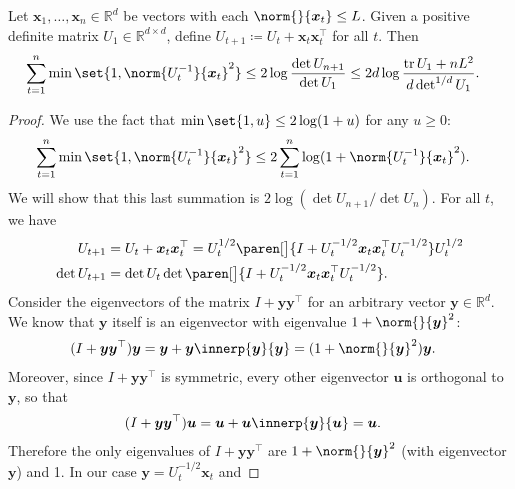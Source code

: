 \documentclass{article}
\renewcommand{\vec}[1]{\bm{#1}}
\newcommand{\defeq}{\coloneq}
\newcommand{\inv}[1]{#1^{-1}}
\newcommand{\Real}{\mathds{R}}
\newcommand{\tr}{\operatorname{tr}}
\renewcommand{\det}{\operatorname{det}}
\DeclarePairedDelimiter{\paren}()
\providecommand\transp{\top}
\let\transpsymbol\transp
\renewcommand{\transp}[1]{#1^\transpsymbol}
\begin{document}
\begin{lemma}\label{lemma:elliptical-potential}
  Let $\vec x_1,\dotsc,\vec x_n \in \Real^d$ be vectors with each
  $\norm{}{\vec x_t} \le L$.  Given a positive definite matrix
  $U_1\in\Real^{d\times d}$, define
  $U_{t+1} \defeq U_t + \vec x_t \transp{\vec x_t}$ for all $t$.  Then
  \begin{align*}
    \sum_{t=1}^n\min\set{1, \norm{\inv{U_t}}{\vec x_t}^2}
    &\le 2\log\frac{\det U_{n+1}}{\det U_1}
      \le 2d\log\frac{\tr U_1+nL^2}{d\det^{1/d} U_1}.
  \end{align*}
\end{lemma}

\begin{proof}
  We use the fact that $\min\set{1, u} \le 2\log(1+u)$ for any
  $u \ge 0$:
  \begin{align*}
    \sum_{t=1}^n\min\set{1, \norm{\inv{U_t}}{\vec x_t}^2}
    &\le 2 \sum_{t=1}^n \log(1 + \norm{\inv{U_t}}{\vec x_t}^2).
  \end{align*}
  We will show that this last summation is $2\log(\det U_{n+1}/\det
  U_n)$.  For all $t$, we have
  \begin{align*}
    U_{t+1} &= U_t + \vec x_t \transp{\vec x_t}
             = U_t^{1/2}
             \paren[\big]{I + U_t^{-1/2} \vec x_t \transp{\vec x_t} U_t^{-1/2}}
             U_t^{1/2} \\
    \det U_{t+1} &=\det U_t
                  \det\paren[\big]{I +
                  U_t^{-1/2} \vec x_t \transp{\vec x_t}
                  U_t^{-1/2}}.
  \end{align*}
  Consider the eigenvectors of the matrix $I + \vec y \transp{\vec y}$
  for an arbitrary vector $\vec y \in \Real^d$.  We know that $\vec y$
  itself is an eigenvector with eigenvalue $1+\norm{}{\vec y}^2$:
  \begin{align*}
    (I + \vec y \transp{\vec y}) \vec y
    &= \vec y + \vec y \innerp{\vec y}{\vec y} = (1+\norm{}{\vec y}^2)\vec y.
  \end{align*}
  Moreover, since $I + \vec y \transp{\vec y}$ is symmetric, every
  other eigenvector $\vec u$ is orthogonal to $\vec y$, so that
  \begin{align*}
    (I + \vec y \transp{\vec y}) \vec u
    &= \vec u + \vec u \innerp{\vec y}{\vec u} = \vec u.
  \end{align*}
  Therefore the only eigenvalues of $I + \vec y \transp{\vec y}$ are
  $1+\norm{}{\vec y}^2$ (with eigenvector $\vec y$) and 1.  In our
  case $\vec y = U_t^{-1/2} \vec x_t$ and

\end{proof}
\end{document}
